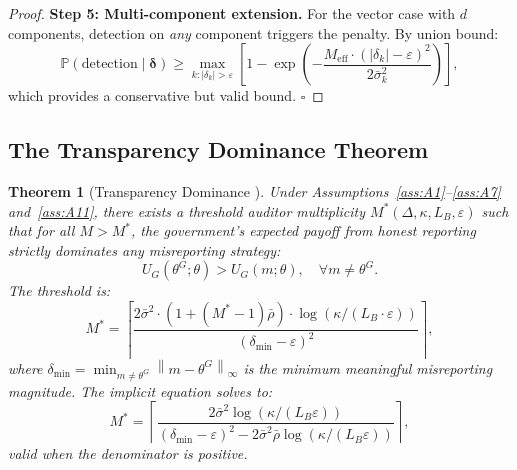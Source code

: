 \documentclass[11pt,a4paper]{article}
\newtheorem{theorem}{Theorem}[section]
\theoremstyle{definition}
\newcommand{\Pbb}{\mathbb{P}}
\newcommand{\norm}[1]{\left\lVert#1\right\rVert}
\newcommand{\abs}[1]{\left|#1\right|}
\begin{document}
\begin{proof}
\textbf{Step 5: Multi-component extension.} For the vector case with $d$ components, detection on \textit{any} component triggers the penalty. By union bound:
\begin{equation}
    \Pbb(\text{detection} \mid \bm{\delta}) \geq \max_{k: \abs{\delta_k} > \varepsilon} \left[1 - \exp\left(-\frac{M_{\mathrm{eff}} \cdot (\abs{\delta_k} - \varepsilon)^2}{2\bar{\sigma}_k^2}\right)\right],
    \label{eq:multi_component}
\end{equation}
which provides a conservative but valid bound. $\square$
\end{proof}
\subsection{The Transparency Dominance Theorem}
\begin{theorem}[Transparency Dominance ]
\label{thm:transparency}
Under Assumptions~\ref{ass:A1}--\ref{ass:A7} and~\ref{ass:A11}, there exists a threshold auditor multiplicity $M^*(\Delta, \kappa, L_B, \varepsilon)$ such that for all $M > M^*$, the government's expected payoff from honest reporting strictly dominates any misreporting strategy:
\begin{equation}
    U_G(\theta^G; \theta) > U_G(m; \theta), \quad \forall m \neq \theta^G.
    \label{eq:dominance}
\end{equation}
The threshold is:
\begin{equation}
    M^* = \left\lceil \frac{2\bar{\sigma}^2 \cdot (1 + (M^*-1)\bar{\rho}) \cdot \log(\kappa / (L_B \cdot \varepsilon))}{(\delta_{\min} - \varepsilon)^2} \right\rceil,
    \label{eq:M_star}
\end{equation}
where $\delta_{\min} = \min_{m \neq \theta^G} \norm{m - \theta^G}_\infty$ is the minimum meaningful misreporting magnitude. The implicit equation solves to:
\begin{equation}
    M^* = \left\lceil \frac{2\bar{\sigma}^2 \log(\kappa / (L_B \varepsilon))}{(\delta_{\min} - \varepsilon)^2 - 2\bar{\sigma}^2 \bar{\rho} \log(\kappa / (L_B \varepsilon))} \right\rceil,
    \label{eq:M_star_explicit}
\end{equation}
valid when the denominator is positive.
\end{theorem}
\end{document}
